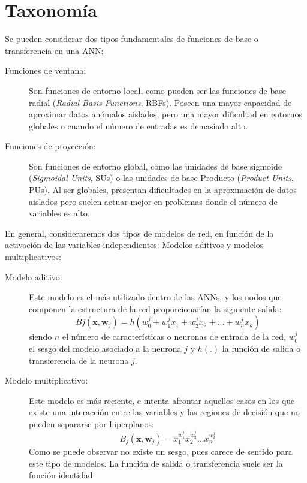 \section{Taxonomía}\label{taxonomia}
\noindent Se pueden considerar dos tipos fundamentales de funciones de
base o transferencia en una ANN:
\begin{description}
\item[Funciones de ventana:] Son funciones de entorno local, como pueden ser las
funciones de base radial (\textit{Radial  Basis  Functions}, RBFs).  Poseen  una  mayor
capacidad de aproximar  datos anómalos aislados, pero una mayor dificultad en entornos
globales o cuando el número de entradas es demasiado alto.
\item[Funciones de proyección:] Son funciones de entorno global, como las unidades
de base sigmoide (\textit{Sigmoidal Units}, SUs) o las  unidades de base Producto
(\textit{Product	Units}, PUs). Al ser globales, presentan dificultades en 	la
aproximación de  datos	aislados pero suelen actuar mejor en problemas donde el	número
de variables es alto.
\end{description}

En  general,  consideraremos  dos  tipos  de  modelos  de  red, en función de
la activación de las variables independientes: Modelos aditivos  y
modelos multiplicativos:
\begin{description}
	\item[Modelo aditivo:] Este modelo es el más utilizado dentro de las ANNs, y los nodos
	que componen la estructura de la red proporcionarían la siguiente salida:
	\begin{displaymath}
	B{j}\left(
	\mathbf{x},\mathbf{w}_{j}\right)=h\left(w_{0}^j+w_{1}^jx_{1}+w_{2}^jx_{2}+...+w_{n}^jx_{
	 k} \right)
	\end{displaymath}
	siendo $n$ el número de características o neuronas de entrada de la red, $w_{0}^j$ el
	sesgo del modelo asociado a la neurona $j$ y $h(.)$ la función de salida o
transferencia
	de la	neurona $j$.
	\item[Modelo multiplicativo:] Este modelo es más reciente, e   intenta  afrontar
	aquellos  casos  en	los  que  existe  una  interacción  entre  las  variables  y  las
	regiones  de decisión	que no  pueden 	separarse por hiperplanos:
	\begin{displaymath}
	B_{j}\left(\mathbf{x},\mathbf{w}_{j}\right)=
	x_{1}^{w_{1}^j}x_{2}^{w_{2}^j}...x_{n}^{w_{k}^j}
	\end{displaymath}
	Como se puede observar no existe un sesgo, pues carece de sentido para este tipo
	de modelos. La función de salida o transferencia suele ser la función identidad.
\end{description}

